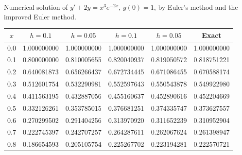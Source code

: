 \begin{examplesolution}
\begin{newtable}
  \label{table:3.2.2} Numerical solution of $y'+2y=x^{3}e^{-2x}$, $y(0)=1$, by Euler's method and
  the improved Euler method.
  \begin{center}
    \begin{tabular}{|c|r|r|r|r|r|}
      \hline
      \multicolumn{1}{|c|}{$x$} & \multicolumn{1}{|c|}{$h=0.1$} & \multicolumn{1}{|c|}{$h=0.05$}      & \multicolumn{1}{|c|}{$h=0.1$} & \multicolumn{1}{|c|}{$h=0.05$} & \multicolumn{1}{|c|}{Exact} \\
      \hline
      0.0                       & 1.000000000                   & 1.000000000                         & 1.000000000                   & 1.000000000                    & 1.000000000                 \\
      0.1                       & 0.800000000                   & 0.810005655                         & 0.820040937                   & 0.819050572                    & 0.818751221                 \\
      0.2                       & 0.640081873                   & 0.656266437                         & 0.672734445                   & 0.671086455                    & 0.670588174                 \\
      0.3                       & 0.512601754                   & 0.532290981                         & 0.552597643                   & 0.550543878                    & 0.549922980                 \\
      0.4                       & 0.411563195                   & 0.432887056                         & 0.455160637                   & 0.452890616                    & 0.452204669                 \\
      0.5                       & 0.332126261                   & 0.353785015                         & 0.376681251                   & 0.374335747                    & 0.373627557                 \\
      0.6                       & 0.270299502                   & 0.291404256                         & 0.313970920                   & 0.311652239                    & 0.310952904                 \\
      0.7                       & 0.222745397                   & 0.242707257                         & 0.264287611                   & 0.262067624                    & 0.261398947                 \\
      0.8                       & 0.186654593                   & 0.205105754                         & 0.225267702                   & 0.223194281                    & 0.222570721                 \\

\end{tabular}
\end{center}
\end{newtable}
\end{examplesolution}

